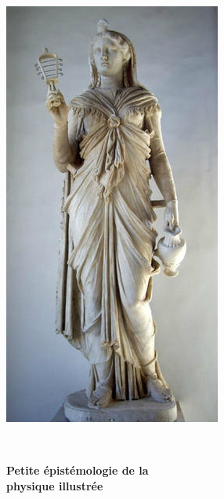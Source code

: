 \begin{titlepage}
%

\begin{center}
\includegraphics[scale=0.40]{./presentation/anubis}
\end{center}

\textsc{\Large }\\[0.5cm]

\HRule

\begin{center}
{\huge \bfseries  Petite épistémologie de la \\
physique illustrée\\[0.4cm] }
\end{center}

\HRule \\[1.5cm]



\end{titlepage}
